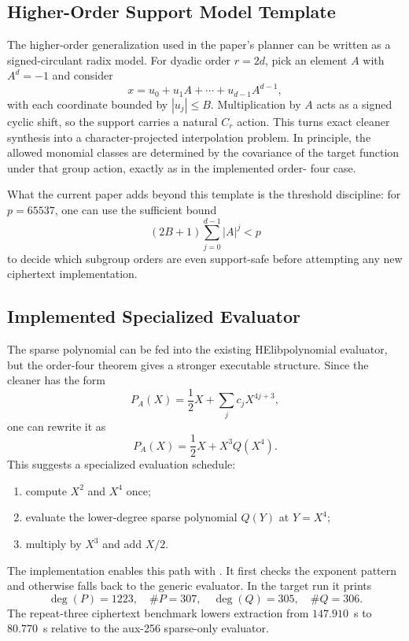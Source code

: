 \documentclass[a4paper,runningheads]{llncs}
\newcommand{\HElib}{\textsf{HElib}}
\begin{document}
\subsection{Higher-Order Support Model Template}

The higher-order generalization used in the paper's planner can be written as a
signed-circulant radix model.  For dyadic order $r=2d$, pick an element $A$ with
$A^d=-1$ and consider
\[
  x=u_0+u_1A+\cdots+u_{d-1}A^{d-1},
\]
with each coordinate bounded by $|u_j|\le B$.  Multiplication by $A$ acts as a
signed cyclic shift, so the support carries a natural $C_r$ action.  This turns
exact cleaner synthesis into a character-projected interpolation problem.  In
principle, the allowed monomial classes are determined by the covariance of the
target function under that group action, exactly as in the implemented order-
four case.

What the current paper adds beyond this template is the threshold discipline:
for $p=65537$, one can use the sufficient bound
\[
  (2B+1)\sum_{j=0}^{d-1}|A|^j < p
\]
to decide which subgroup orders are even support-safe before attempting any new
ciphertext implementation.

\subsection{Implemented Specialized Evaluator}

The sparse polynomial can be fed into the existing \HElib polynomial evaluator,
but the order-four theorem gives a stronger executable structure.  Since the
cleaner has the form
\[
  P_A(X)=\frac{1}{2}X+\sum_{j} c_jX^{4j+3},
\]
one can rewrite it as
\[
  P_A(X)=\frac{1}{2}X+X^3Q(X^4).
\]
This suggests a specialized evaluation schedule:
\begin{enumerate}[leftmargin=*]
  \item compute $X^2$ and $X^4$ once;
  \item evaluate the lower-degree sparse polynomial $Q(Y)$ at $Y=X^4$;
  \item multiply by $X^3$ and add $X/2$.
\end{enumerate}
The implementation enables this path with .  It
first checks the exponent pattern and otherwise falls back to the generic
evaluator.  In the target run it prints
\[
  \deg(P)=1223,\quad \#P=307,\quad \deg(Q)=305,\quad \#Q=306.
\]
The repeat-three ciphertext benchmark lowers extraction from $147.910$~s to
$80.770$~s relative to the aux-256 sparse-only evaluator.
\end{document}

